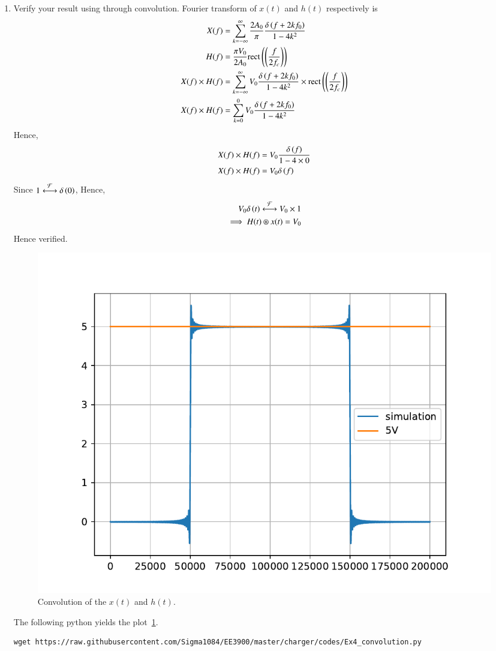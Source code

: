 \documentclass[journal,12pt,twocolumn]{IEEEtran}
\renewcommand\thesection{\arabic{section}}
\begin{document}
\begin{enumerate}[label=\thesection.\arabic*, ref=\thesection.\theenumi]
\item Verify your result using  through convolution.
\solution
	Fourier transform of $x(t)$ and $h(t)$ respectively is
	\begin{align}
		X(f)&=\sum_{k=-\infty}^{\infty} \frac{2A_0}{\pi} \frac{\delta\left(f+2kf_0\right)}{1-4k^2}\\
		H(f)&=\frac{\pi V_0}{2A_0}\text{rect}\left(\left(\frac{f}{2f_c}\right)\right)\\
		X(f) \times H(f)&=\sum_{k=-\infty}^{\infty} V_0 \frac{\delta\left(f+2kf_0\right)}{1-4k^2} \times \text{rect}\left(\left(\frac{f}{2f_c}\right)\right)\\
		X(f)\times H(f)&=\sum_{k=0}^{0} V_0 \frac{\delta\left(f+2kf_0\right)}{1-4k^2}
	\end{align}
	Hence,
	\begin{align}
		X(f)\times H(f)&=V_0 \frac{\delta\left(f\right)}{1-4 \times 0}\\
		X(f)\times H(f)&=V_0 \delta\left(f\right)
	\end{align}
Since $1\overset{\mathcal{F}}{ \longleftrightarrow} \delta\left(0\right)$,
Hence,
\begin{align}
	V_0 \delta\left(t\right) \overset{\mathcal{F}}{ \longleftrightarrow} V_0\times 1 \\
	\implies H(t) \circledast x(t)=V_0
\end{align}
Hence verified.
\begin{figure}[!ht]
	\includegraphics[width=\columnwidth]{figs/Ex4_convolution}
	\caption{Convolution of the $x(t)$ and $h(t)$.}
	\label{fig:convolution}
\end{figure}
The following python yields the plot~\ref{fig:convolution}.
\begin{lstlisting}
wget https://raw.githubusercontent.com/Sigma1084/EE3900/master/charger/codes/Ex4_convolution.py
\end{lstlisting}


\end{enumerate}
\end{document}
